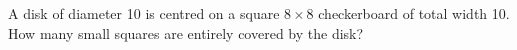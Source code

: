 A disk of diameter 10 is centred on a square $8\times8$ checkerboard of total width 10. How many small squares are entirely covered by the disk?
